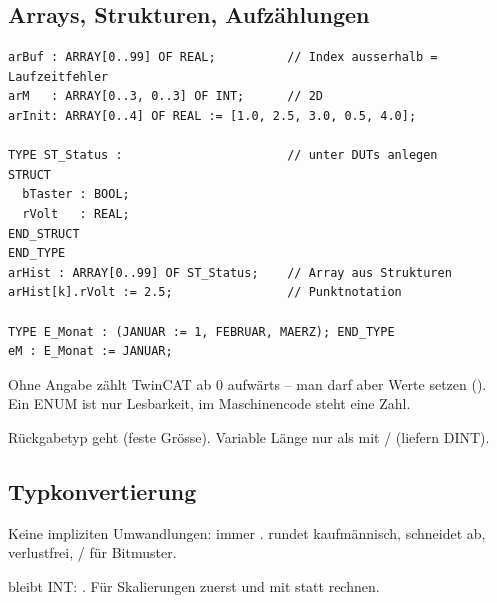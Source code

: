 \subsection{Arrays, Strukturen, Aufzählungen}
\begin{lstlisting}
arBuf : ARRAY[0..99] OF REAL;          // Index ausserhalb = Laufzeitfehler
arM   : ARRAY[0..3, 0..3] OF INT;      // 2D
arInit: ARRAY[0..4] OF REAL := [1.0, 2.5, 3.0, 0.5, 4.0];

TYPE ST_Status :                       // unter DUTs anlegen
STRUCT
  bTaster : BOOL;
  rVolt   : REAL;
END_STRUCT
END_TYPE
arHist : ARRAY[0..99] OF ST_Status;    // Array aus Strukturen
arHist[k].rVolt := 2.5;                // Punktnotation

TYPE E_Monat : (JANUAR := 1, FEBRUAR, MAERZ); END_TYPE
eM : E_Monat := JANUAR;
\end{lstlisting}
\begin{falle}
Ohne Angabe zählt TwinCAT ab 0 aufwärts -- man darf aber Werte setzen
(). Ein ENUM ist nur Lesbarkeit, im Maschinencode steht
eine Zahl.
\end{falle}
 Rückgabetyp  geht (feste
Grösse). Variable Länge nur als 
mit  /  (liefern DINT).

\subsection{Typkonvertierung}
Keine impliziten Umwandlungen: immer .
 rundet kaufmännisch,  schneidet ab,
 verlustfrei, / für
Bitmuster.
\begin{falle}[Ganzzahldivision]
 bleibt INT: . Für Skalierungen zuerst
 und mit  statt  rechnen.
\end{falle}

